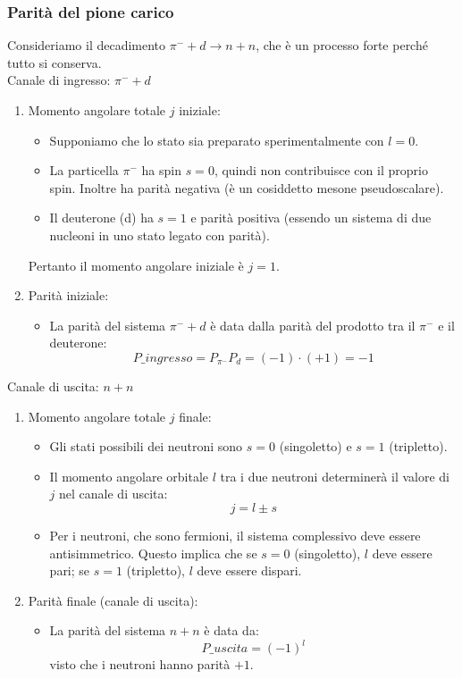 \subsubsection{Parità del pione carico}
Consideriamo il decadimento $\pi^-+d\to n+n$, che è un processo forte perché tutto si conserva.\\
Canale di ingresso: $\pi^-+d$
\begin{enumerate}
    \item Momento angolare totale $j$ iniziale:
    \begin{itemize}
        \item Supponiamo che lo stato sia preparato sperimentalmente con $l=0$.
        \item La particella $\pi^-$ ha spin $s=0$, quindi non contribuisce con il proprio spin. Inoltre ha parità negativa (è un cosiddetto mesone pseudoscalare).
        \item Il deuterone (d) ha $s=1$ e parità positiva (essendo un sistema di due nucleoni in uno stato legato con parità).
    \end{itemize}
    Pertanto il momento angolare iniziale è $j=1$. 
    \item Parità iniziale:
    \begin{itemize}
        \item La parità del sistema $\pi^-+d$ è data dalla parità del prodotto tra il $\pi^-$ e il deuterone:
        \begin{equation*}
        P\_{ingresso}=P_{\pi^-}P_d=(-1)\cdot (+1)= -1
        \end{equation*}
    \end{itemize}
\end{enumerate}
Canale di uscita: $n+n$
\begin{enumerate}
    \item Momento angolare totale $j$ finale:
    \begin{itemize}
        \item Gli stati possibili dei neutroni sono $s=0$ (singoletto) e $s=1$ (tripletto).
        \item Il momento angolare orbitale $l$ tra i due neutroni determinerà il valore di $j$ nel canale di uscita:
        \begin{equation*}
        j=l\pm s
        \end{equation*}
        \item Per i neutroni, che sono fermioni, il sistema complessivo deve essere antisimmetrico. Questo implica che se $s=0$ (singoletto), $l$ deve essere pari; se $s=1$ (tripletto), $l$ deve essere dispari.
    \end{itemize} 
    \item Parità finale (canale di uscita):
    \begin{itemize}
        \item La parità del sistema $n+n$ è data da:
        \begin{equation*}
        P\_{uscita}=(-1)^l
        \end{equation*}
        visto che i neutroni hanno parità $+1$.
    \end{itemize}
\end{enumerate}
